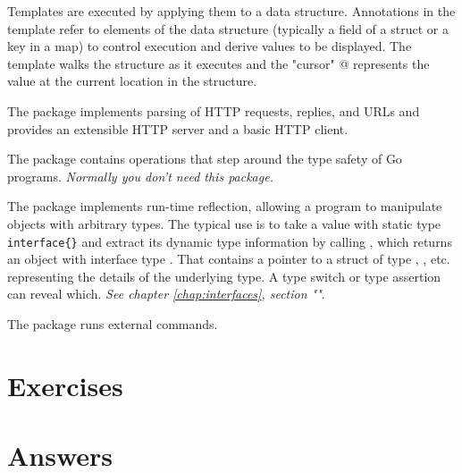 \begin{description}
{Templates are executed by applying them to a data structure.  Annotations in
the template refer to elements of the data structure (typically a field of a
struct or a key in a map) to control execution and derive values to be
displayed.  The template walks the structure as it executes and the "cursor" @
represents the value at the current location in the structure.
}
\item[\package{http}]{
The  package implements parsing of HTTP requests, replies,
and URLs and provides an extensible HTTP server and a basic
HTTP client.
}
\item[\package{unsafe}]{
The  package contains operations that step around the type safety of Go programs.
\emph{Normally you don't need this package.}
}
\item[\package{reflect}]{
The  package implements run-time reflection, allowing a program to
manipulate objects with arbitrary types.  The typical use is to take a
value with static type \lstinline|interface{}| and extract its dynamic type
information by calling , which returns an object with interface
type .  That contains a pointer to a struct of type ,
, etc. representing the details of the underlying type.  A type
switch or type assertion can reveal which. \emph{See chapter \ref{chap:interfaces}, 
section ""}.
}
\item[\package{exec}]{
The  package runs external commands.
}
\end{description}

\section{Exercises}





\cleardoublepage
\section{Answers}
\shipoutAnswer
